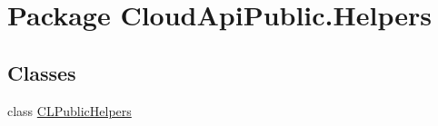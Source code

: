 \hypertarget{namespace_cloud_api_public_1_1_helpers}{\section{Package Cloud\-Api\-Public.\-Helpers}
\label{namespace_cloud_api_public_1_1_helpers}
}
\subsection*{Classes}
\begin{DoxyCompactItemize}
\item 
class \hyperlink{class_cloud_api_public_1_1_helpers_1_1_c_l_public_helpers}{C\-L\-Public\-Helpers}
\end{DoxyCompactItemize}
